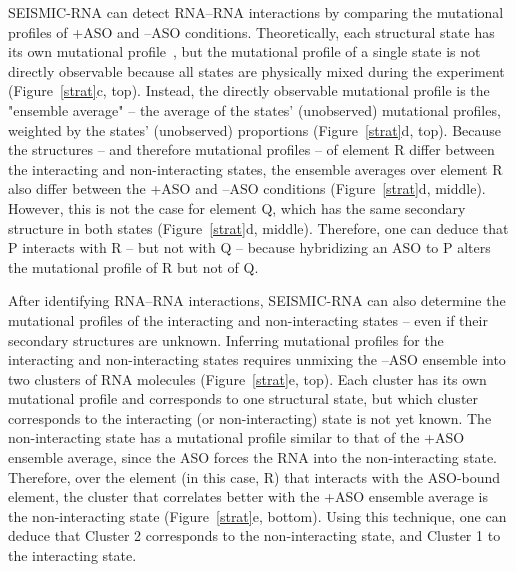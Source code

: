 \documentclass[main.tex]{subfiles}
\begin{document}
SEISMIC-RNA can detect RNA--RNA interactions by comparing the mutational profiles of +ASO and --ASO conditions.
Theoretically, each structural state has its own mutational profile~\cite{Sherpa2015}, but the mutational profile of a single state is not directly observable because all states are physically mixed during the experiment (Figure~\ref{strat}c, top).
Instead, the directly observable mutational profile is the "ensemble average" -- the average of the states' (unobserved) mutational profiles, weighted by the states' (unobserved) proportions (Figure~\ref{strat}d, top).
Because the structures -- and therefore mutational profiles -- of element R differ between the interacting and non-interacting states, the ensemble averages over element R also differ between the +ASO and --ASO conditions (Figure~\ref{strat}d, middle).
However, this is not the case for element Q, which has the same secondary structure in both states (Figure~\ref{strat}d, middle).
Therefore, one can deduce that P interacts with R -- but not with Q -- because hybridizing an ASO to P alters the mutational profile of R but not of Q.

After identifying RNA--RNA interactions, SEISMIC-RNA can also determine the mutational profiles of the interacting and non-interacting states -- even if their secondary structures are unknown.
Inferring mutational profiles for the interacting and non-interacting states requires unmixing the --ASO ensemble into two clusters of RNA molecules (Figure~\ref{strat}e, top).
Each cluster has its own mutational profile and corresponds to one structural state, but which cluster corresponds to the interacting (or non-interacting) state is not yet known.
The non-interacting state has a mutational profile similar to that of the +ASO ensemble average, since the ASO forces the RNA into the non-interacting state.
Therefore, over the element (in this case, R) that interacts with the ASO-bound element, the cluster that correlates better with the +ASO ensemble average is the non-interacting state (Figure~\ref{strat}e, bottom).
Using this technique, one can deduce that Cluster 2 corresponds to the non-interacting state, and Cluster 1 to the interacting state.
\end{document}
